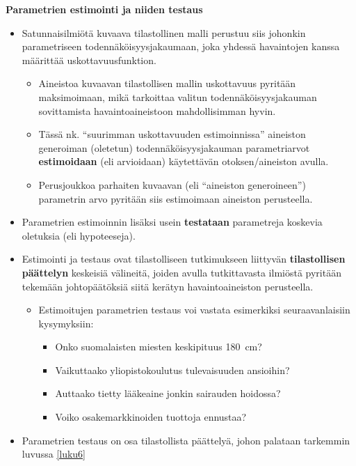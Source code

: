 \documentclass[
]{book}
\providecommand{\tightlist}{%
  \setlength{\itemsep}{0pt}\setlength{\parskip}{0pt}}
\begin{document}
\hfill\break

\textbf{Parametrien estimointi ja niiden testaus}

\begin{itemize}
\tightlist
\item
  Satunnaisilmiötä kuvaava tilastollinen malli perustuu siis johonkin parametriseen todennäköisyysjakaumaan, joka yhdessä havaintojen kanssa määrittää uskottavuusfunktion.

  \begin{itemize}
  \tightlist
  \item
    Aineistoa kuvaavan tilastollisen mallin uskottavuus pyritään maksimoimaan, mikä tarkoittaa valitun todennäköisyysjakauman sovittamista havaintoaineistoon mahdollisimman hyvin.
  \item
    Tässä nk. ``suurimman uskottavuuden estimoinnissa'' aineiston generoiman (oletetun) todennäköisyysjakauman parametriarvot \textbf{estimoidaan} (eli arvioidaan) käytettävän otoksen/aineiston avulla.
  \item
    Perusjoukkoa parhaiten kuvaavan (eli ``aineiston generoineen'') parametrin arvo pyritään siis estimoimaan aineiston perusteella.
  \end{itemize}
\item
  Parametrien estimoinnin lisäksi usein \textbf{testataan} parametreja koskevia oletuksia (eli hypoteeseja).
\item
  Estimointi ja testaus ovat tilastolliseen tutkimukseen liittyvän \textbf{tilastollisen päättelyn} keskeisiä välineitä, joiden avulla tutkittavasta ilmiöstä pyritään tekemään johtopäätöksiä siitä kerätyn havaintoaineiston perusteella.

  \begin{itemize}
  \tightlist
  \item
    Estimoitujen parametrien testaus voi vastata esimerkiksi seuraavanlaisiin kysymyksiin:

    \begin{itemize}
    \tightlist
    \item
      Onko suomalaisten miesten keskipituus 180~cm?
    \item
      Vaikuttaako yliopistokoulutus tulevaisuuden ansioihin?
    \item
      Auttaako tietty lääkeaine jonkin sairauden hoidossa?
    \item
      Voiko osakemarkkinoiden tuottoja ennustaa?
    \end{itemize}
  \end{itemize}
\item
  Parametrien testaus on osa tilastollista päättelyä, johon palataan tarkemmin luvussa \ref{luku6}
\end{itemize}
\end{document}
